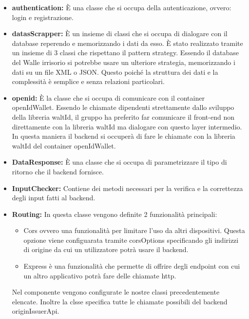 \begin{itemize}
    \item \textbf{authentication:} È una classe che si occupa della autenticazione, ovvero: login e registrazione. 
    \item \textbf{datasScrapper:} È un insieme di classi che si occupa di dialogare con il database reperendo e memorizzando i dati da esso. È stato realizzato tramite un insieme di 3 classi che rispettano il pattern strategy. Essendo il database del Walle irrisorio si potrebbe usare un ulteriore strategia, memorizzando i dati su un file XML o JSON. Questo poiché la struttura dei dati e la complessità è semplice e senza relazioni particolari.
    \item \textbf{openid:} È la classe che si occupa di comunicare con il container openIdWallet. Essendo le chiamate dipendenti strettamente dallo sviluppo della libreria waltId, il gruppo ha preferito far comunicare il front-end non direttamente con la libreria waltId ma dialogare con questo layer intermedio. In questa maniera il backend si occuperà di fare le chiamate con la libreria waltId del container openIdWallet.
    \item \textbf{DataResponse:} È una classe che si occupa di parametrizzare il tipo di ritorno che il backend fornisce.
    \item \textbf{InputChecker:} Contiene dei metodi necessari per la verifica e la correttezza degli input fatti al backend.
    \item \textbf{Routing:} In questa classe vengono definite 2 funzionalità principali:
    \begin{itemize}
    \item Cors ovvero una funzionalità per limitare l'uso da altri dispositivi. Questa opzione viene configuarata tramite corsOptions specificando gli indirizzi di origine da cui un utilizzatore potrà usare il backend. 
    \item Express è una funzionalità che permette di offrire degli endpoint con cui un altro applicativo potrà fare delle chiamate http. 
    \end{itemize}
    Nel componente vengono configurate le nostre classi precedentemente elencate.
    Inoltre la clsse specifica tutte le chiamate possibili del backend originIssuerApi.
\end{itemize}

